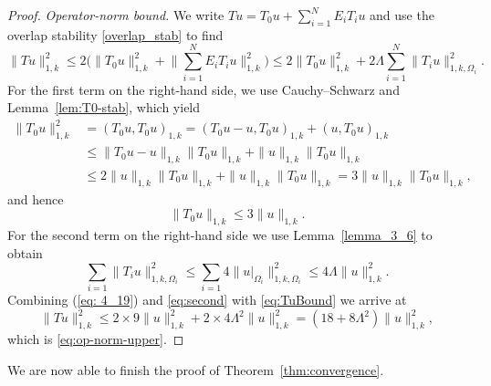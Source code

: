 \documentclass[preprint,3p,times]{elsarticle}
\theoremstyle{definition}
\numberwithin{equation}{section}
\begin{document}
\begin{proof}
\medskip
\noindent\textit{Operator-norm bound.}
We write $Tu=T_0u+\sum_{i=1}^N E_iT_i u$ and use the overlap stability \eqref{overlap_stab} to find
\begin{equation}\label{eq:TuBound}
    \|Tu\|_{1, k}^2 \le 2\biggl(\|T_0u\|_{1,k}^2 + \Big\|\sum_{i=1}^N E_iT_i u\Big\|_{1,k}^2\biggr)
	\le 2\|T_0u\|_{1, k}^2 + 2\Lambda\sum_{i=1}^N \|T_i u\|_{1, k, \Omega_i}^2.
\end{equation}
For the first term on the right-hand side, we use Cauchy--Schwarz and Lemma~\ref{lem:T0-stab}, which yield
\begin{align*}
	\|T_0 u\|_{1,k}^2 &= (T_0 u, T_0 u)_{1,k} 
	= (T_0 u - u, T_0 u)_{1,k} + (u, T_0 u)_{1,k} 
	\\[0.5ex]
	&\le \|T_0 u - u\|_{1,k}\|T_0 u\|_{1,k} + \|u\|_{1,k}\|T_0 u\|_{1,k}
	\\[0.5ex]
	&\le 2\|u\|_{1,k}\|T_0 u\|_{1,k} + \|u\|_{1,k}\|T_0 u\|_{1,k} 
	= 3\|u\|_{1,k}\|T_0 u\|_{1,k}, 
\end{align*}
and hence
\begin{equation}\label{eq: 4_19}
	\|T_0 u\|_{1,k} \le 3 \|u\|_{1,k}. 
\end{equation}
For the second term on the right-hand side we use Lemma~\ref{lemma_3_6} to obtain
\begin{equation}
	\label{eq:second}
	\sum_{i=1} \|T_i u\|_{1,k,\Omega_i}^2 
	\le \sum_{i=1} 4\big\|u|_{\Omega_i}\big\|_{1,k,\Omega_i}^2 
	\le 4 \Lambda\|u\|_{1,k}^2. 
\end{equation}
Combining (\ref{eq: 4_19}) and \eqref{eq:second} with \eqref{eq:TuBound} we arrive at
\begin{equation*}
	\|Tu\|_{1,k}^2 \le 2\times9\|u\|_{1,k}^2 + 2\times4\Lambda^2\|u\|_{1,k}^2 
	= (18 + 8\Lambda^2)\|u\|_{1,k}^2,
\end{equation*} 
which is \eqref{eq:op-norm-upper}.
\end{proof}

We are now able to finish the proof of Theorem~\ref{thm:convergence}.
\end{document}
